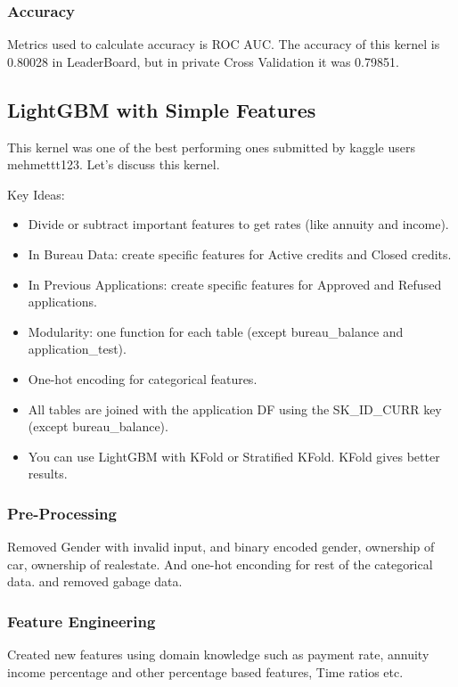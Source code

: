 \documentclass[twoside,a4paper]{article}
\begin{document}
\subsubsection{Accuracy}
Metrics used to calculate accuracy is ROC AUC. The accuracy of this kernel is 0.80028 in LeaderBoard, but in private Cross Validation it was 0.79851.
\subsection{LightGBM with Simple Features}

This kernel was one of the best performing ones submitted by kaggle users mehmettt123. Let's discuss this kernel. 

Key Ideas:
\begin{itemize}
    \item Divide or subtract important features to get rates (like annuity and income).
    \item In Bureau Data: create specific features for Active credits and Closed credits.
    \item In Previous Applications: create specific features for Approved and Refused applications.
    \item Modularity: one function for each table (except bureau\_balance and application\_test).
    \item One-hot encoding for categorical features.
    \item All tables are joined with the application DF using the SK\_ID\_CURR key (except bureau\_balance).
    \item You can use LightGBM with KFold or Stratified KFold. KFold gives better results.
\end{itemize}

\subsubsection{Pre-Processing}
Removed Gender with invalid input, and binary encoded gender, ownership of car, ownership of realestate. And one-hot enconding for rest of the categorical data. and removed gabage data.

\subsubsection{Feature Engineering}
Created new features using domain knowledge such as payment rate, annuity income percentage and other percentage based features, Time ratios etc.
\end{document}
